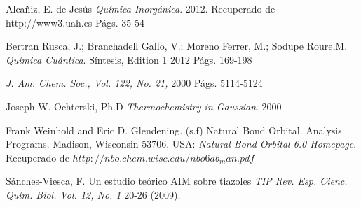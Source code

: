 \begin{thebibliography}{9}
Alcañiz, E. de Jesús  
\textit{Química Inorgánica}. 
2012. 
Recuperado de http://www3.uah.es Págs. 35-54

Bertran Rusca, J.; Branchadell Gallo, V.; Moreno Ferrer, M.; Sodupe Roure,M.  
\textit{Química Cuántica}. Síntesis, Edition 1
2012 Págs. 169-198

\textit{J. Am. Chem. Soc., Vol. 122, No. 21, }
2000 Págs. 5114-5124

Joseph W. Ochterski, Ph.D
\textit{Thermochemistry in Gaussian}.
2000

Frank Weinhold and Eric D. Glendening. (s.f) Natural Bond Orbital. Analysis Programs. Madison, Wisconsin 53706, USA: 
\textit {Natural Bond Orbital 6.0 Homepage}. Recuperado de $http://nbo.chem.wisc.edu/nbo6ab_man.pdf$

Sánches-Viesca, F. Un estudio teórico AIM sobre tiazoles \textit{TIP Rev. Esp. Cienc. Quím. Biol. Vol. 12, No. 1} 20-26 (2009).
\end{thebibliography}